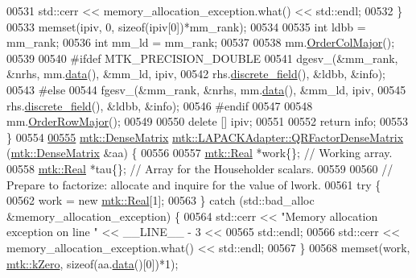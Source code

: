 \begin{DoxyCode}
00531     std::cerr << memory\_allocation\_exception.what() << std::endl;
00532   \}
00533   memset(ipiv, 0, \textcolor{keyword}{sizeof}(ipiv[0])*mm\_rank);
00534 
00535   \textcolor{keywordtype}{int} ldbb = mm\_rank;
00536   \textcolor{keywordtype}{int} mm\_ld = mm\_rank;
00537 
00538   mm.\hyperlink{classmtk_1_1DenseMatrix_a59b9bea24acf39dca64e8549b3527463}{OrderColMajor}();
00539 
00540 \textcolor{preprocessor}{  #ifdef MTK\_PRECISION\_DOUBLE}
00541   dgesv\_(&mm\_rank, &nrhs, mm.\hyperlink{classmtk_1_1DenseMatrix_a0c33b8a9e01d157c61ddbdf807c25d84}{data}(), &mm\_ld, ipiv,
00542          rhs.\hyperlink{classmtk_1_1UniStgGrid1D_ab9c3f9ee2ac76a351b01e4abfede4d19}{discrete\_field}(), &ldbb, &info);
00543 \textcolor{preprocessor}{  #else}
00544   fgesv\_(&mm\_rank, &nrhs, mm.\hyperlink{classmtk_1_1DenseMatrix_a0c33b8a9e01d157c61ddbdf807c25d84}{data}(), &mm\_ld, ipiv,
00545          rhs.\hyperlink{classmtk_1_1UniStgGrid1D_ab9c3f9ee2ac76a351b01e4abfede4d19}{discrete\_field}(), &ldbb, &info);
00546 \textcolor{preprocessor}{  #endif}
00547 
00548   mm.\hyperlink{classmtk_1_1DenseMatrix_ac2949efba3e8278335d45418c85433e4}{OrderRowMajor}();
00549 
00550   \textcolor{keyword}{delete} [] ipiv;
00551 
00552   \textcolor{keywordflow}{return} info;
00553 \}
00554 
\hypertarget{mtk__lapack__adapter_8cc_source_l00555}{}\hyperlink{classmtk_1_1LAPACKAdapter_ae5c6e78c9c819c9ac7a6f31bfd011d7a}{00555} \hyperlink{classmtk_1_1DenseMatrix}{mtk::DenseMatrix} \hyperlink{classmtk_1_1LAPACKAdapter_ae5c6e78c9c819c9ac7a6f31bfd011d7a}{mtk::LAPACKAdapter::QRFactorDenseMatrix}
      (\hyperlink{classmtk_1_1DenseMatrix}{mtk::DenseMatrix} &aa) \{
00556 
00557   \hyperlink{group__c01-roots_gac080bbbf5cbb5502c9f00405f894857d}{mtk::Real} *work\{\}; \textcolor{comment}{// Working array.}
00558   \hyperlink{group__c01-roots_gac080bbbf5cbb5502c9f00405f894857d}{mtk::Real} *tau\{\};  \textcolor{comment}{// Array for the Householder scalars.}
00559 
00560   \textcolor{comment}{// Prepare to factorize: allocate and inquire for the value of lwork.}
00561   \textcolor{keywordflow}{try} \{
00562     work = \textcolor{keyword}{new} \hyperlink{group__c01-roots_gac080bbbf5cbb5502c9f00405f894857d}{mtk::Real}[1];
00563   \} \textcolor{keywordflow}{catch} (std::bad\_alloc &memory\_allocation\_exception) \{
00564     std::cerr << \textcolor{stringliteral}{"Memory allocation exception on line "} << \_\_LINE\_\_ - 3 <<
00565       std::endl;
00566     std::cerr << memory\_allocation\_exception.what() << std::endl;
00567   \}
00568   memset(work, \hyperlink{group__c01-roots_ga59a451a5fae30d59649bcda274fea271}{mtk::kZero}, \textcolor{keyword}{sizeof}(aa.\hyperlink{classmtk_1_1DenseMatrix_a0c33b8a9e01d157c61ddbdf807c25d84}{data}()[0])*1);

\end{DoxyCode}
